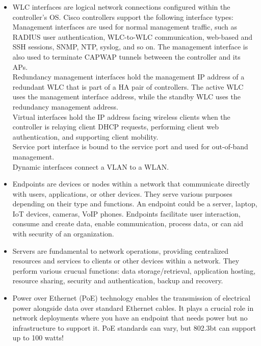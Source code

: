 \documentclass{article}
\begin{document}
\begin{itemize}
  	\item[] WLC interfaces are logical network connections configured within the controller's OS. Cisco controllers support the following interface types:\\
		Management interfaces are used for normal management traffic, such as RADIUS user authentication, WLC-to-WLC communication, web-based and SSH sessions, SNMP, NTP, syslog, and so on. The management interface is also used to terminate CAPWAP tunnels betweeen the controller and its APs.\\
		
		Redundancy management interfaces hold the management IP address of a redundant WLC that is part of a HA pair of controllers. The active WLC uses the management interface address, while the standby WLC uses the redundancy management address.\\
		
		Virtual interfaces hold the IP address facing wireless clients when the controller is relaying client DHCP requests, performing client web authentication, and supporting client mobility.\\
		
		Service port interface is bound to the service port and used for out-of-band management.\\
		
		Dynamic interfaces connect a VLAN to a WLAN.
	\item[] Endpoints are devices or nodes within a network that communicate directly with users, applications, or other devices. They serve various purposes depending on their type and functions. An endpoint could be a server, laptop, IoT devices, cameras, VoIP phones. Endpoints facilitate user interaction, consume and create data, enable communication, process data, or can aid with security of an organization.
	\item[] Servers are fundamental to network operations, providing centralized resources and services to clients or other devices within a network. They perform various crucual functions: data storage/retrieval, application hosting, resource sharing, security and authentication, backup and recovery.
	\item[] Power over Ethernet (PoE) technology enables the transmission of electrical power alongside data over standard Ethernet cables. It plays a crucial role in network deployments where you have an endpoint that needs power but no infrastructure to support it. PoE standards can vary, but 802.3bt can support up to 100 watts!
  

\end{itemize}
\end{document}
